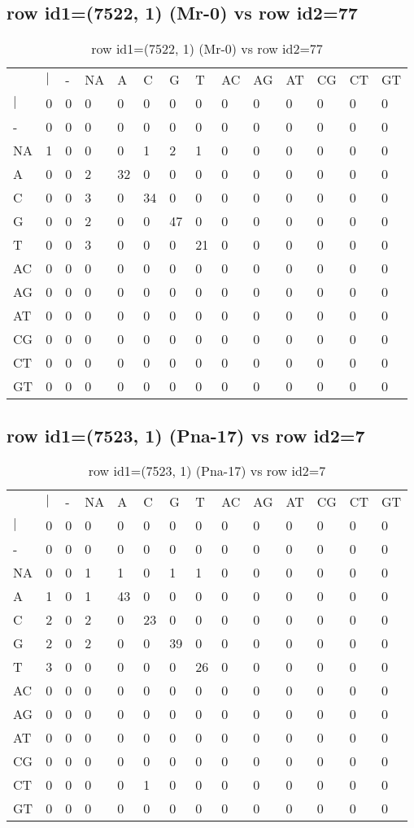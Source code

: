 \subsection{row id1=(7522, 1) (Mr-0) vs row id2=77}
\begin{center}
\begin{longtable}{|l|l|l|l|l|l|l|l|l|l|l|l|l|l|}
\caption{row id1=(7522, 1) (Mr-0) vs row id2=77} \label{table_dm334}\\
\hline
\\
\hline
&$|$&-&NA&A&C&G&T&AC&AG&AT&CG&CT&GT\\
$|$&0&0&0&0&0&0&0&0&0&0&0&0&0\\
-&0&0&0&0&0&0&0&0&0&0&0&0&0\\
NA&1&0&0&0&1&2&1&0&0&0&0&0&0\\
A&0&0&2&32&0&0&0&0&0&0&0&0&0\\
C&0&0&3&0&34&0&0&0&0&0&0&0&0\\
G&0&0&2&0&0&47&0&0&0&0&0&0&0\\
T&0&0&3&0&0&0&21&0&0&0&0&0&0\\
AC&0&0&0&0&0&0&0&0&0&0&0&0&0\\
AG&0&0&0&0&0&0&0&0&0&0&0&0&0\\
AT&0&0&0&0&0&0&0&0&0&0&0&0&0\\
CG&0&0&0&0&0&0&0&0&0&0&0&0&0\\
CT&0&0&0&0&0&0&0&0&0&0&0&0&0\\
GT&0&0&0&0&0&0&0&0&0&0&0&0&0\\
\hline
\end{longtable}
\end{center}

\subsection{row id1=(7523, 1) (Pna-17) vs row id2=7}
\begin{center}
\begin{longtable}{|l|l|l|l|l|l|l|l|l|l|l|l|l|l|}
\caption{row id1=(7523, 1) (Pna-17) vs row id2=7} \label{table_dm336}\\
\hline
\\
\hline
&$|$&-&NA&A&C&G&T&AC&AG&AT&CG&CT&GT\\
$|$&0&0&0&0&0&0&0&0&0&0&0&0&0\\
-&0&0&0&0&0&0&0&0&0&0&0&0&0\\
NA&0&0&1&1&0&1&1&0&0&0&0&0&0\\
A&1&0&1&43&0&0&0&0&0&0&0&0&0\\
C&2&0&2&0&23&0&0&0&0&0&0&0&0\\
G&2&0&2&0&0&39&0&0&0&0&0&0&0\\
T&3&0&0&0&0&0&26&0&0&0&0&0&0\\
AC&0&0&0&0&0&0&0&0&0&0&0&0&0\\
AG&0&0&0&0&0&0&0&0&0&0&0&0&0\\
AT&0&0&0&0&0&0&0&0&0&0&0&0&0\\
CG&0&0&0&0&0&0&0&0&0&0&0&0&0\\
CT&0&0&0&0&1&0&0&0&0&0&0&0&0\\
GT&0&0&0&0&0&0&0&0&0&0&0&0&0\\
\hline
\end{longtable}
\end{center}

